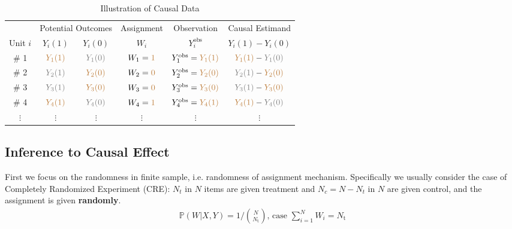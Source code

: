         \begin{table}[H]
            \centering
            \renewcommand\arraystretch{1}
            \caption{Illustration of Causal Data}
            \begin{tabular}{cccccc}
                \hline
                \hline
                &\multicolumn{2}{c}{Potential Outcomes}&Assignment&Observation&Causal Estimand\\
                \cline{2-3}
                Unit $ i $&$ Y_i(1) $&$ Y_i(0) $&$ W_i $&$ Y^\mathrm{obs}_i  $&$ Y_i(1)-Y_i(0) $\\
                \hline
                \# 1&$ \color{brown}Y_1(1) $&$ \color{gray}Y_1(0) $&$ W_1={\color{brown}1} $&$ Y^\mathrm{obs}_1=\color{brown}Y_1(1)  $&$ {\color{brown}Y_1(1)}-{\color{gray}Y_1(0)} $\\
                \# 2&$ \color{gray}Y_2(1) $&$ \color{brown}Y_2(0) $&$ W_2={\color{brown}0} $&$ Y^\mathrm{obs}_2=\color{brown}Y_2(0)  $&$ {\color{gray}Y_2(1)}-{\color{brown}Y_2(0)} $\\
                \# 3&$ \color{gray}Y_3(1) $&$ \color{brown}Y_3(0) $&$ W_3={\color{brown}0} $&$ Y^\mathrm{obs}_3=\color{brown}Y_3(0)  $&$ {\color{gray}Y_3(1)}-{\color{brown}Y_3(0)} $\\
                \# 4&$ \color{brown}Y_4(1) $&$ \color{gray}Y_4(0) $&$ W_4={\color{brown}1} $&$ Y^\mathrm{obs}_4=\color{brown}Y_4(1)  $&$ {\color{brown}Y_4(1)}-{\color{gray}Y_4(0)} $\\
                $ \vdots $&$ \vdots $&$ \vdots $&$ \vdots $&$ \vdots $&$ \vdots $\\
                \hline
                \hline
            \end{tabular}
            \label{}
        \end{table}
    

    


\subsection{Inference to Causal Effect}

First we focus on the randomness in finite sample, i.e. randomness of assignment mechanism. Specifically we usually consider the case of Completely Randomized Experiment (CRE): $ N_t $ in $ N $ items are given treatment and $ N_c=N-N_t $ in $ N $ are given control, and the assignment is given \textbf{randomly}. 
\begin{align}
    \mathbb{P}\left( W|X,Y \right)=1\bigg/\binom{N}{N_\mathrm{t} },\,\text{case }\sum_{i=1}^NW_i=N_\mathrm{t}   
\end{align}

